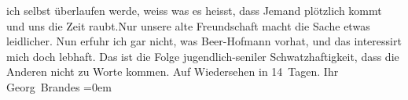 \begin{ledgroupsized}[t]{13cm}
               ich selbst überlaufen werde, weiss {\pb}was es heisst, dass Jemand plötzlich kommt und uns die Zeit raubt.\hspace*{1.5em}Nur unsere alte Freundschaft macht die Sache etwas
               leidlicher.\pend
           \pstart
           Nun erfuhr ich gar nicht, was Beer-Hofmann
               vorhat, und das interessirt mich doch lebhaft. Das ist die Folge jugendlich-seniler
               Schwatzhaftigkeit, dass die Anderen nicht zu Worte kommen.\pend
           \pstart
           Auf Wiedersehen in 14 Tagen.\pend
           \pstart
           Ihr{\\[\baselineskip]}\spacefill\mbox{Georg Brandes}\pend
           \leftskip=0em{}
         
         \endnumbering{}\end{ledgroupsized}  \newcommand{\dateiname}{L01121}\newcommand{\titel}{Georg Brandes an Arthur Schnitzler, 17. 5. 1901}\newcommand{\editorInnen}{Martin Anton Müller und Gerd-Hermann Susen}
      